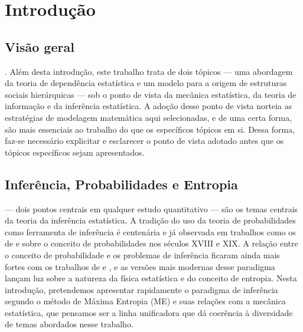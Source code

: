 \chapter{Introdução}

\setlength{\epigraphwidth}{0.7\textwidth}
\begin{epigraphs}
\end{epigraphs}

\section{Visão geral}
. Além desta introdução, este trabalho trata de dois tópicos --- uma abordagem da teoria de dependência estatística e um modelo para a origem de estruturas sociais hierárquicas --- sob o ponto de vista da mecânica estatística, da teoria de informação e da inferência estatística. A adoção desse ponto de vista norteia as estratégias de modelagem matemática aqui selecionadas, e de uma certa forma, são mais essenciais ao trabalho do que os específicos tópicos em si. Dessa forma, faz-se necessário explicitar e esclarecer o ponto de vista adotado antes que os tópicos específicos sejam apresentados. 

\section{Inferência, Probabilidades e Entropia}
\label{sec:inferencia}

 --- dois pontos centrais em qualquer estudo quantitativo --- são os temas centrais da teoria da inferência estatística. A tradição do uso da teoria de probabilidades como ferramenta de inferência é centenária e já observada em trabalhos como os de \citet{moivre1718} e \citet{laplace1814, laplace1840} sobre o conceito de probabilidades nos séculos XVIII e XIX. A relação entre o conceito de probabilidade e os problemas de inferência ficaram ainda mais fortes com os trabalhos de \citet{Cox1946}\cite[-9cm]{Cox1946,Cox1961} e \citet{Shannon1948}\cite[-6cm]{Shannon1948}, e as versões mais modernas desse paradigma\cite[-5cm]{Jaynes2003,ACaticha2008,ACaticha2009} lançam luz sobre a natureza da física estatística e do conceito de entropia. Nesta introdução, pretendemos apresentar rapidamente o paradigma de inferência segundo o método de Máxima Entropia (ME) e suas relações com a mecânica estatística, que pensamos ser a linha unificadora que dá coerência à diversidade de temas abordados nesse trabalho. 

